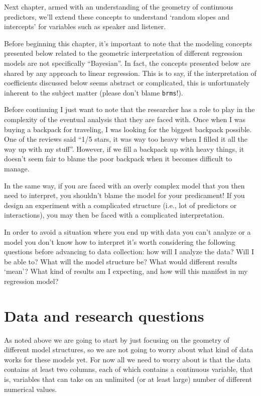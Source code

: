 \documentclass[
]{book}
\begin{document}
Next chapter, armed with an understanding of the geometry of continuous predictors, we'll extend these concepts to understand `random slopes and intercepts' for variables such as speaker and listener.

Before beginning this chapter, it's important to note that the modeling concepts presented below related to the geometric interpretation of different regression models are not specifically ``Bayesian''. In fact, the concepts presented below are shared by any approach to linear regression. This is to say, if the interpretation of coefficients discussed below seems abstract or complicated, this is unfortunately inherent to the subject matter (please don't blame \texttt{brms}!).

Before continuing I just want to note that the researcher has a role to play in the complexity of the eventual analysis that they are faced with. Once when I was buying a backpack for traveling, I was looking for the biggest backpack possible. One of the reviews said ``1/5 stars, it was way too heavy when I filled it all the way up with my stuff''. However, if we fill a backpack up with heavy things, it doesn't seem fair to blame the poor backpack when it becomes difficult to manage.

In the same way, if you are faced with an overly complex model that you then need to interpret, you shouldn't blame the model for your predicament! If you design an experiment with a complicated structure (i.e., lot of predictors or interactions), you may then be faced with a complicated interpretation.

In order to avoid a situation where you end up with data you can't analyze or a model you don't know how to interpret it's worth considering the following questions before advancing to data collection: how will I analyze the data? Will I be able to? What will the model structure be? What would different results `mean'? What kind of results am I expecting, and how will this manifest in my regression model?

\hypertarget{data-and-research-questions-4}{%
\section{Data and research questions}\label{data-and-research-questions-4}}

As noted above we are going to start by just focusing on the geometry of different model structures, so we are not going to worry about what kind of data works for these models yet. For now all we need to worry about is that the data contains at least two columns, each of which contains a continuous variable, that is, variables that can take on an unlimited (or at least large) number of different numerical values.
\end{document}
